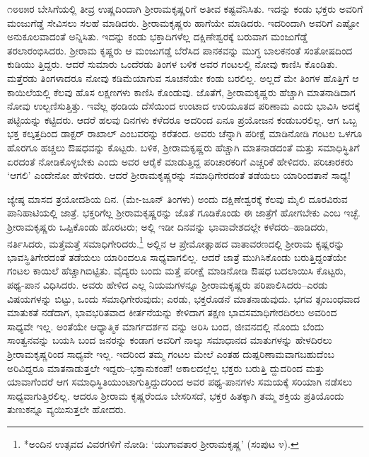೧೮೮೫ರ ಬೇಸಿಗೆಯಲ್ಲಿ ತೀವ್ರ ಉಷ್ಣದಿಂದಾಗಿ ಶ್ರೀರಾಮಕೃಷ್ಣರಿಗೆ ಅತೀವ ಕಷ್ಟವೆನಿಸಿತು. ಇದನ್ನು ಕಂಡು ಭಕ್ತರು ಅವರಿಗೆ ಮಂಜುಗೆಡ್ಡೆ ಸೇವಿಸಲು ಸಲಹೆ ಮಾಡಿದರು. ಶ್ರೀರಾಮಕೃಷ್ಣರು ಹಾಗೆಯೇ ಮಾಡಿದರು. ಇದರಿಂದಾಗಿ ಅವರಿಗೆ ಎಷ್ಟೋ ಅನುಕೂಲವಾದಂತೆ ಅನ್ನಿಸಿತು. ಇದನ್ನು ಕಂಡು ಭಕ್ತಾದಿಗಳೆಲ್ಲ ದಕ್ಷಿಣೇಶ್ವರಕ್ಕೆ ಬರುವಾಗ ಮಂಜುಗೆಡ್ಡೆ ತರಲಾರಂಭಿಸಿದರು. ಶ್ರೀರಾಮ ಕೃಷ್ಣರು ಆ ಮಂಜುಗಡ್ಡೆ ಬೆರೆಸಿದ ಪಾನಕವನ್ನು ಮುಗ್ಧ ಬಾಲಕನಂತೆ ಸಂತೋಷದಿಂದ ಕುಡಿಯು ತ್ತಿದ್ದರು. ಆದರೆ ಸುಮಾರು ಒಂದೆರಡು ತಿಂಗಳ ಬಳಿಕ ಅವರ ಗಂಟಲಲ್ಲಿ ನೋವು ಕಾಣಿಸಿ ಕೊಂಡಿತು. ಮತ್ತೆರಡು ತಿಂಗಳಾದರೂ ನೋವು ಕಡಿಮೆಯಾಗುವ ಸೂಚನೆಯೇ ಕಂಡು ಬರಲಿಲ್ಲ. ಅಲ್ಲದೆ ಮೇ ತಿಂಗಳ ಹೊತ್ತಿಗೆ ಆ ಕಾಯಿಲೆಯಲ್ಲಿ ಕೆಲವು ಹೊಸ ಲಕ್ಷಣಗಳು ಕಾಣಿಸಿ ಕೊಂಡುವು. ಜೊತೆಗೆ, ಶ್ರೀರಾಮಕೃಷ್ಣರು ಹೆಚ್ಚಾಗಿ ಮಾತನಾಡಿದಾಗ ನೋವು ಉಲ್ಬಣಿಸುತ್ತಿತ್ತು. ಇವೆಲ್ಲ ಥಂಡಿಯ ದೆಸೆಯಿಂದ ಉಂಟಾದ ಉರಿಯೂತದ ಪರಿಣಾಮ ಎಂದು ಭಾವಿಸಿ ಅದಕ್ಕೆ ಪಟ್ಟಿಯನ್ನು ಕಟ್ಟಿದರು. ಆದರೆ ಹಲವು ದಿನಗಳು ಕಳೆದರೂ ಅದರಿಂದ ಏನೂ ಪ್ರಯೋಜನ ಕಂಡುಬರಲಿಲ್ಲ. ಆಗ ಒಬ್ಬ ಭಕ್ತ ಕಲ್ಕತ್ತದಿಂದ ಡಾಕ್ಟರ್ ರಾಖಾಲ್ ಎಂಬವರನ್ನು ಕರೆತಂದ. ಅವರು ಚೆನ್ನಾಗಿ ಪರೀಕ್ಷೆ ಮಾಡಿನೋಡಿ ಗಂಟಲ ಒಳಗೂ ಹೊರಗೂ ಹಚ್ಚಲು ಔಷಧವನ್ನು ಕೊಟ್ಟರು. ಬಳಿಕ, ಶ್ರೀರಾಮಕೃಷ್ಣರು ಹೆಚ್ಚಾಗಿ ಮಾತನಾಡದಂತೆ ಮತ್ತು ಸಮಾಧಿಸ್ಥಿತಿಗೆ ಏರದಂತೆ ನೋಡಿಕೊಳ್ಳಬೇಕು ಎಂದು ಅವರ ಆರೈಕೆ ಮಾಡುತ್ತಿದ್ದ ಪರಿಚಾರಕರಿಗೆ ಎಚ್ಚರಿಕೆ ಹೇಳಿದರು. ಪರಿಚಾರಕರು ‘ಆಗಲಿ’ ಎಂದೇನೋ ಹೇಳಿದರು. ಆದರೆ ಶ್ರೀರಾಮಕೃಷ್ಣರನ್ನು ಸಮಾಧಿಗೇರದಂತೆ ತಡೆಯಲು ಯಾರಿಂದತಾನೆ ಸಾಧ್ಯ!

ಜ್ಯೇಷ್ಠ ಮಾಸದ ತ್ರಯೋದಶಿಯ ದಿನ. (ಮೇ-ಜೂನ್ ತಿಂಗಳು) ಅಂದು ದಕ್ಷಿಣೇಶ್ವರಕ್ಕೆ ಕೆಲವು ಮೈಲಿ ದೂರವಿರುವ ಪಾನಿಹಾಟಿಯಲ್ಲಿ ಜಾತ್ರೆ. ಭಕ್ತರಿಗೆಲ್ಲ ಶ್ರೀರಾಮಕೃಷ್ಣರನ್ನು ಜೊತೆ ಗೂಡಿಕೊಂಡು ಈ ಜಾತ್ರೆಗೆ ಹೋಗಬೇಕು ಎಂಬ ಇಚ್ಛೆ. ಶ್ರೀರಾಮಕೃಷ್ಣರು ಒಪ್ಪಿಕೊಂಡು ಹೊರಟರು; ಅಲ್ಲಿ ಇಡೀ ದಿನವನ್ನು ಭಾವಾವೇಶದಲ್ಲೇ ಕಳೆದರು–ಹಾಡಿದರು, ನರ್ತಿಸಿದರು, ಮತ್ತೆಮತ್ತೆ ಸಮಾಧಿಗೇರಿದರು.\footnote{*ಅಂದಿನ ಉತ್ಸವದ ವಿವರಗಳಿಗೆ ನೋಡಿ: `ಯುಗಾವತಾರ ಶ್ರೀರಾಮಕೃಷ್ಣ' (ಸಂಪುಟ ೪).} ಅಲ್ಲಿನ ಆ ಪ್ರೇಮೋತ್ಸಾಹದ ವಾತಾವರಣದಲ್ಲಿ ಶ್ರೀರಾಮ ಕೃಷ್ಣರನ್ನು ಭಾವಸ್ಥಿತಿಗೇರದಂತೆ ತಡೆಯಲು ಯಾರಿಂದಲೂ ಸಾಧ್ಯವಾಗಲಿಲ್ಲ. ಆದರೆ ಜಾತ್ರೆ ಮುಗಿಸಿಕೊಂಡು ಬರುತ್ತಿದ್ದಂತೆಯೇ ಗಂಟಲ ಕಾಯಿಲೆ ಹೆಚ್ಚಾಗಿಬಿಟ್ಟಿತು. ವೈದ್ಯರು ಬಂದು ಮತ್ತೆ ಪರೀಕ್ಷೆ ಮಾಡಿನೋಡಿ ಔಷಧ ಬದಲಾಯಿಸಿ ಕೊಟ್ಟರು, ಪಥ್ಯ-ಪಾನ ವಿಧಿಸಿದರು. ಅವರು ಹೇಳಿದ ಎಲ್ಲ ನಿಯಮಗಳನ್ನೂ ಶ್ರೀರಾಮಕೃಷ್ಣರು ಪರಿಪಾಲಿಸಿದರು–ಎರಡು ವಿಷಯಗಳನ್ನು ಬಿಟ್ಟು, ಒಂದು ಸಮಾಧಿಗೇರುವುದು; ಎರಡು, ಭಕ್ತರೊಡನೆ ಮಾತನಾಡುವುದು. ಭಗವ ತ್ಸಂಬಂಧವಾದ ಮಾತುಕತೆ ನಡೆದಾಗ, ಭಾವಭರಿತವಾದ ಕೀರ್ತನೆಯನ್ನು ಕೇಳಿದಾಗ ತಕ್ಷಣ ಭಾವಸಮಾಧಿಗೇರದಿರಲು ಅವರಿಂದ ಸಾಧ್ಯವೇ ಇಲ್ಲ. ಅಂತೆಯೇ ಆಧ್ಯಾತ್ಮಿಕ ಮಾರ್ಗದರ್ಶನ ವನ್ನು ಅರಿಸಿ ಬಂದ, ಜೀವನದಲ್ಲಿ ನೊಂದು ಬೆಂದು ಸಾಂತ್ವನವನ್ನು ಬಯಸಿ ಬಂದ ಜನರನ್ನು ಕಂಡಾಗ ಅವರಿಗೆ ನಾಲ್ಕು ಸಮಾಧಾನದ ಮಾತುಗಳನ್ನು ಹೇಳದಿರಲು ಶ್ರೀರಾಮಕೃಷ್ಣರಿಂದ ಸಾಧ್ಯವೇ ಇಲ್ಲ. ಇದರಿಂದ ತಮ್ಮ ಗಂಟಲ ಮೇಲೆ ಎಂತಹ ದುಷ್ಪರಿಣಾಮವಾಗಬಹುದೆಂಬ ಅರಿವಿದ್ದರೂ ಮಾತನಾಡುತ್ತಲೇ ಇದ್ದರು–ಭಕ್ತಾನುಕಂಪೆ! ಅಕಾಲದಲ್ಲೆಲ್ಲ ಭಕ್ತರು ಬರುತ್ತಿ ದ್ದುದರಿಂದ ಮತ್ತು ಯಾವಾಗೆಂದರೆ ಆಗ ಸಮಾಧಿಸ್ಥಿತಿಯುಂಟಾಗುತ್ತಿದ್ದುದರಿಂದ ಅವರ ಪಥ್ಯ-ಪಾನಗಳು ಸಮಯಕ್ಕೆ ಸರಿಯಾಗಿ ನಡೆಸಲು ಸಾಧ್ಯವಾಗುತ್ತಿರಲಿಲ್ಲ. ಆದರೂ ಶ್ರೀರಾಮ ಕೃಷ್ಣರೆಂದೂ ಬೇಸರಿಸದೆ, ಭಕ್ತರ ಹಿತಕ್ಕಾಗಿ ತಮ್ಮ ಶಕ್ತಿಯ ಪ್ರತಿಯೊಂದು ತುಣುಕನ್ನೂ ವ್ಯಯಿಸುತ್ತಲೇ ಹೋದರು.

